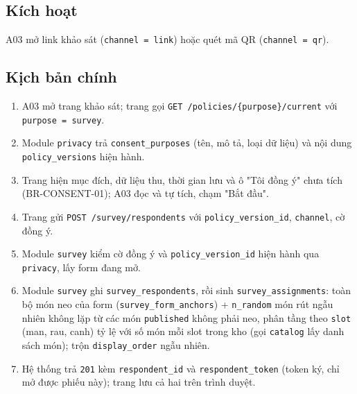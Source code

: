 \subsection{Kích hoạt}
A03 mở link khảo sát ({\small\texttt{channel = link}}) hoặc quét mã QR ({\small\texttt{channel = qr}}).

\subsection{Kịch bản chính}
\begin{enumerate}
\item A03 mở trang khảo sát; trang gọi {\small\texttt{GET /\allowbreak{}\allowbreak{}policies/\allowbreak{}\allowbreak{}\{purpose\}/\allowbreak{}\allowbreak{}current}} với {\small\texttt{purpose = survey}}.
\item Module {\small\texttt{privacy}} trả {\small\texttt{consent\_\allowbreak{}\allowbreak{}purposes}} (tên, mô tả, loại dữ liệu) và nội dung {\small\texttt{policy\_\allowbreak{}\allowbreak{}versions}} hiện hành.
\item Trang hiện mục đích, dữ liệu thu, thời gian lưu và ô "Tôi đồng ý" chưa tích (BR-\allowbreak{}CONSENT-\allowbreak{}01); A03 đọc và tự tích, chạm "Bắt đầu".
\item Trang gửi {\small\texttt{POST /\allowbreak{}\allowbreak{}survey/\allowbreak{}\allowbreak{}respondents}} với {\small\texttt{policy\_\allowbreak{}\allowbreak{}version\_\allowbreak{}\allowbreak{}id}}, {\small\texttt{channel}}, cờ đồng ý.
\item Module {\small\texttt{survey}} kiểm cờ đồng ý và {\small\texttt{policy\_\allowbreak{}\allowbreak{}version\_\allowbreak{}\allowbreak{}id}} hiện hành qua {\small\texttt{privacy}}, lấy form đang mở.
\item Module {\small\texttt{survey}} ghi {\small\texttt{survey\_\allowbreak{}\allowbreak{}respondents}}, rồi sinh {\small\texttt{survey\_\allowbreak{}\allowbreak{}assignments}}: toàn bộ món neo của form ({\small\texttt{survey\_\allowbreak{}\allowbreak{}form\_\allowbreak{}\allowbreak{}anchors}}) + {\small\texttt{n\_\allowbreak{}\allowbreak{}random}} món rút ngẫu nhiên không lặp từ các món {\small\texttt{published}} không phải neo, phân tầng theo {\small\texttt{slot}} (man, rau, canh) tỷ lệ với số món mỗi slot trong kho (gọi {\small\texttt{catalog}} lấy danh sách món); trộn {\small\texttt{display\_\allowbreak{}\allowbreak{}order}} ngẫu nhiên.
\item Hệ thống trả {\small\texttt{201}} kèm {\small\texttt{respondent\_\allowbreak{}\allowbreak{}id}} và {\small\texttt{respondent\_\allowbreak{}\allowbreak{}token}} (token ký, chỉ mở được phiếu này); trang lưu cả hai trên trình duyệt.

\end{enumerate}

